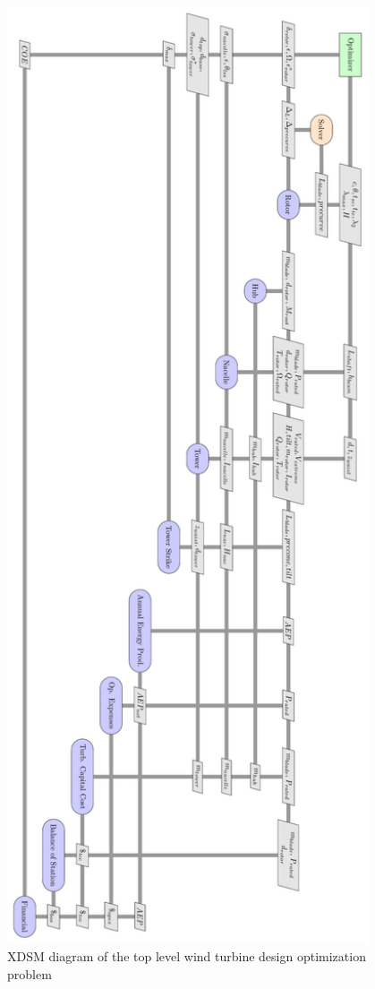 \documentclass[]{aiaa-tc} %
\begin{document}
    \begin{figure}[!p]
        \centering
        \includegraphics[width=0.95\textwidth]{xdsm/wt_xdsm}
        \caption{XDSM diagram of the top level wind turbine design optimization problem}
        \label{fig:xdsm_wt}
    \end{figure}
\end{document}
